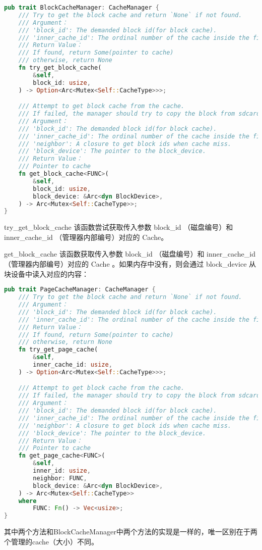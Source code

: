 \begin{lstlisting}[language={Rust},caption={BCM和CM}]
    pub trait BlockCacheManager: CacheManager {
    /// Try to get the block cache and return `None` if not found.
    /// Argument：
    /// 'block_id': The demanded block id(for block cache).
    /// 'inner_cache_id': The ordinal number of the cache inside the file(for page cache).
    /// Return Value：
    /// If found, return Some(pointer to cache)
    /// otherwise, return None
    fn try_get_block_cache(
        &self,
        block_id: usize,
    ) -> Option<Arc<Mutex<Self::CacheType>>>;

    /// Attempt to get block cache from the cache.
    /// If failed, the manager should try to copy the block from sdcard.
    /// Argument：
    /// 'block_id': The demanded block id(for block cache).
    /// 'inner_cache_id': The ordinal number of the cache inside the file(for page cache).
    /// 'neighbor': A closure to get block ids when cache miss.
    /// 'block_device': The pointer to the block_device.
    /// Return Value：
    /// Pointer to cache
    fn get_block_cache<FUNC>(
        &self,
        block_id: usize,
        block_device: &Arc<dyn BlockDevice>,
    ) -> Arc<Mutex<Self::CacheType>>;
}
\end{lstlisting}

try_get_block_cache 该函数尝试获取传⼊参数 block_id （磁盘编号）和 inner_cache_id （管理器内部编号）对应的 Cache。  

get_block_cache 该函数获取传⼊参数 block_id （磁盘编号）和 inner_cache_id （管理器内部编号）对应的 Cache 。如果内存中没有，则会通过 block_device 从块设备中读⼊对应的内容：

\begin{lstlisting}[language={Rust},caption={PageCacheManager}]
    pub trait PageCacheManager: CacheManager {
    /// Try to get the block cache and return `None` if not found.
    /// Argument：
    /// 'block_id': The demanded block id(for block cache).
    /// 'inner_cache_id': The ordinal number of the cache inside the file(for page cache).
    /// Return Value：
    /// If found, return Some(pointer to cache)
    /// otherwise, return None
    fn try_get_page_cache(
        &self,
        inner_cache_id: usize,
    ) -> Option<Arc<Mutex<Self::CacheType>>>;

    /// Attempt to get block cache from the cache.
    /// If failed, the manager should try to copy the block from sdcard.
    /// Argument：
    /// 'block_id': The demanded block id(for block cache).
    /// 'inner_cache_id': The ordinal number of the cache inside the file(for page cache).
    /// 'neighbor': A closure to get block ids when cache miss.
    /// 'block_device': The pointer to the block_device.
    /// Return Value：
    /// Pointer to cache
    fn get_page_cache<FUNC>(
        &self,
        inner_id: usize,
        neighbor: FUNC,
        block_device: &Arc<dyn BlockDevice>,
    ) -> Arc<Mutex<Self::CacheType>>
    where
        FUNC: Fn() -> Vec<usize>;
}
\end{lstlisting}
其中两个方法和BlockCacheManager中两个方法的实现是一样的，唯一区别在于两个管理的cache（大小）不同。


